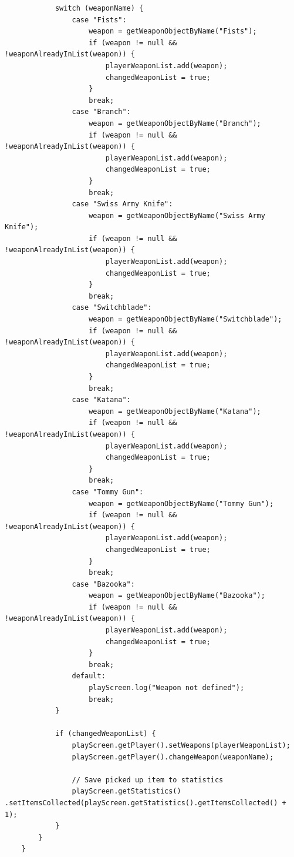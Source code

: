 \documentclass[12p]{article}
\begin{document}
\begin{verbatim}
            switch (weaponName) {
                case "Fists":
                    weapon = getWeaponObjectByName("Fists");
                    if (weapon != null && !weaponAlreadyInList(weapon)) {
                        playerWeaponList.add(weapon);
                        changedWeaponList = true;
                    }
                    break;
                case "Branch":
                    weapon = getWeaponObjectByName("Branch");
                    if (weapon != null && !weaponAlreadyInList(weapon)) {
                        playerWeaponList.add(weapon);
                        changedWeaponList = true;
                    }
                    break;
                case "Swiss Army Knife":
                    weapon = getWeaponObjectByName("Swiss Army Knife");
                    if (weapon != null && !weaponAlreadyInList(weapon)) {
                        playerWeaponList.add(weapon);
                        changedWeaponList = true;
                    }
                    break;
                case "Switchblade":
                    weapon = getWeaponObjectByName("Switchblade");
                    if (weapon != null && !weaponAlreadyInList(weapon)) {
                        playerWeaponList.add(weapon);
                        changedWeaponList = true;
                    }
                    break;
                case "Katana":
                    weapon = getWeaponObjectByName("Katana");
                    if (weapon != null && !weaponAlreadyInList(weapon)) {
                        playerWeaponList.add(weapon);
                        changedWeaponList = true;
                    }
                    break;
                case "Tommy Gun":
                    weapon = getWeaponObjectByName("Tommy Gun");
                    if (weapon != null && !weaponAlreadyInList(weapon)) {
                        playerWeaponList.add(weapon);
                        changedWeaponList = true;
                    }
                    break;
                case "Bazooka":
                    weapon = getWeaponObjectByName("Bazooka");
                    if (weapon != null && !weaponAlreadyInList(weapon)) {
                        playerWeaponList.add(weapon);
                        changedWeaponList = true;
                    }
                    break;
                default:
                    playScreen.log("Weapon not defined");
                    break;
            }

            if (changedWeaponList) {
                playScreen.getPlayer().setWeapons(playerWeaponList);
                playScreen.getPlayer().changeWeapon(weaponName);

                // Save picked up item to statistics
                playScreen.getStatistics() .setItemsCollected(playScreen.getStatistics().getItemsCollected() + 1);
            }
        }
    }
\end{verbatim}
    
\end{document}
